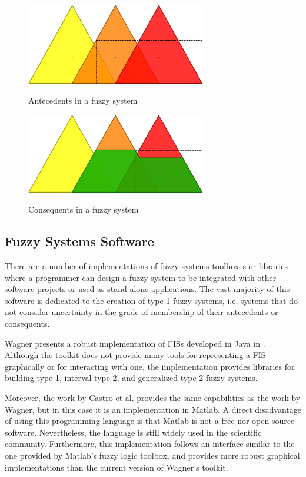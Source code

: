 \begin{figure}
\caption{Antecedents in a fuzzy system}
\centering
\includegraphics[width=0.7\textwidth]{img/antecedents.png}
\label{figure:antecedents}
\end{figure}

\begin{figure}
\caption{Consequents in a fuzzy system}
\centering
\includegraphics[width=0.7\textwidth]{img/consequents.png}
\label{figure:consequents}
\end{figure}

\subsection{Fuzzy Systems Software}
\label{subsection:fuzzy-systems-software}

There are a number of implementations of fuzzy systems toolboxes or libraries
where a programmer can design a fuzzy system to be integrated with other
software projects or used as stand-alone applications. The vast majority of this
software is dedicated to the creation of type-1 fuzzy systems, i.e. systems that
do not consider uncertainty in the grade of membership of their antecedents or
consequents.

Wagner presents a robust implementation of FISs developed in Java in
\cite{Wagner2013}. Although the toolkit does not provide many tools
for representing a FIS graphically or for interacting with one, the
implementation provides libraries for building type-1, interval type-2, and
generalized type-2 fuzzy systems.

Moreover, the work by Castro et al. \cite{castro2007interval} provides the same
capabilities as the work by Wagner, but in this case it is an implementation in
Matlab. A direct disadvantage of using this programming language is that Matlab
is not a free nor open source software.  Nevertheless, the language is still
widely used in the scientific community. Furthermore, this implementation
follows an interface similar to the one provided by Matlab's fuzzy logic
toolbox, and provides more robust graphical implementations than the current
version of Wagner's toolkit.


